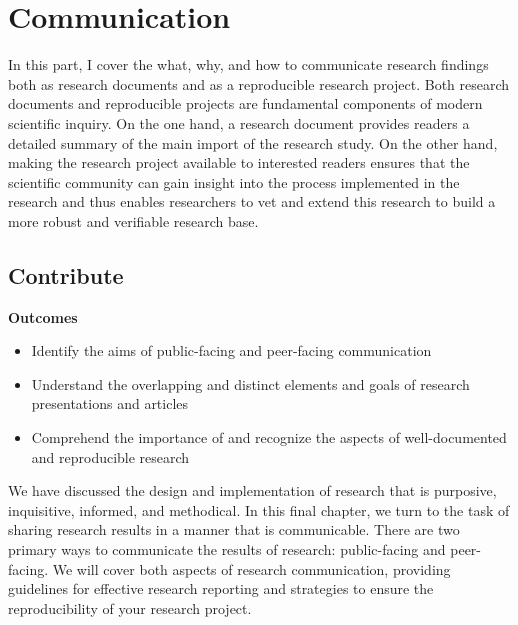 \documentclass[
  letterpaper,
  krantz1]{latex/krantz-mod}
\providecommand{\tightlist}{%
  \setlength{\itemsep}{0pt}\setlength{\parskip}{0pt}}\usepackage{longtable,booktabs,array}
\newcommand{\setDOI}[1]{%
  \gdef\doi{%
    \footnotesize%
    #1\par%
    This chapter has been made available under a CC-BY-NC-ND license.%
  }%
}
\theoremstyle{definition}
\theoremstyle{definition}
\theoremstyle{remark}
\begin{document}
\part{Communication}

In this part, I cover the what, why, and how to communicate research
findings both as research documents and as a reproducible research
project. Both research documents and reproducible projects are
fundamental components of modern scientific inquiry. On the one hand, a
research document provides readers a detailed summary of the main import
of the research study. On the other hand, making the research project
available to interested readers ensures that the scientific community
can gain insight into the process implemented in the research and thus
enables researchers to vet and extend this research to build a more
robust and verifiable research base.

\chapter{Contribute}\label{sec-contribute-chapter}

\setDOI{10.4324/9781003393764.11}
\thispagestyle{chapterfirstpage}

\begin{tcolorbox}[enhanced jigsaw, toprule=.15mm, breakable, colback=white, arc=.35mm, left=2mm, colframe=quarto-callout-color-frame, opacityback=0, bottomrule=.15mm, rightrule=.15mm, leftrule=.75mm]

\textbf{ Outcomes}

\begin{itemize}
\tightlist
\item
  Identify the aims of public-facing and peer-facing communication
\item
  Understand the overlapping and distinct elements and goals of research
  presentations and articles
\item
  Comprehend the importance of and recognize the aspects of
  well-documented and reproducible research
\end{itemize}

\end{tcolorbox}

We have discussed the design and implementation of research that is
purposive, inquisitive, informed, and methodical. In this final chapter,
we turn to the task of sharing research results in a manner that is
communicable. There are two primary ways to communicate the results of
research: public-facing and peer-facing. We will cover both aspects of
research communication, providing guidelines for effective research
reporting and strategies to ensure the reproducibility of your research
project.
\end{document}
